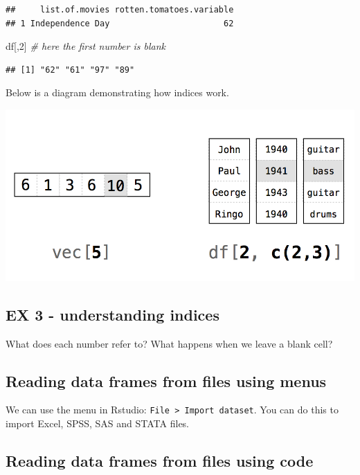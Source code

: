 \documentclass[]{article}
\newenvironment{Shaded}{\begin{snugshade}}{\end{snugshade}}
\newcommand{\CommentTok}[1]{\textcolor[rgb]{0.56,0.35,0.01}{\textit{#1}}}
\newcommand{\DecValTok}[1]{\textcolor[rgb]{0.00,0.00,0.81}{#1}}
\newcommand{\NormalTok}[1]{#1}
\begin{document}
\begin{verbatim}
##     list.of.movies rotten.tomatoes.variable
## 1 Independence Day                       62
\end{verbatim}

\begin{Shaded}
\begin{Highlighting}[]
\NormalTok{df[,}\DecValTok{2}\NormalTok{] }\CommentTok{\# here the first number is blank}
\end{Highlighting}
\end{Shaded}

\begin{verbatim}
## [1] "62" "61" "97" "89"
\end{verbatim}

Below is a diagram demonstrating how indices work.

\includegraphics{indices.png}

\hypertarget{ex-3---understanding-indices}{%
\subsection{EX 3 - understanding
indices}\label{ex-3---understanding-indices}}

What does each number refer to? What happens when we leave a blank cell?

\hypertarget{reading-data-frames-from-files-using-menus}{%
\subsection{Reading data frames from files using
menus}\label{reading-data-frames-from-files-using-menus}}

We can use the menu in Rstudio:
\texttt{File\ \textgreater{}\ Import\ dataset}. You can do this to
import Excel, SPSS, SAS and STATA files.

\hypertarget{reading-data-frames-from-files-using-code}{%
\subsection{Reading data frames from files using
code}\label{reading-data-frames-from-files-using-code}}
\end{document}

